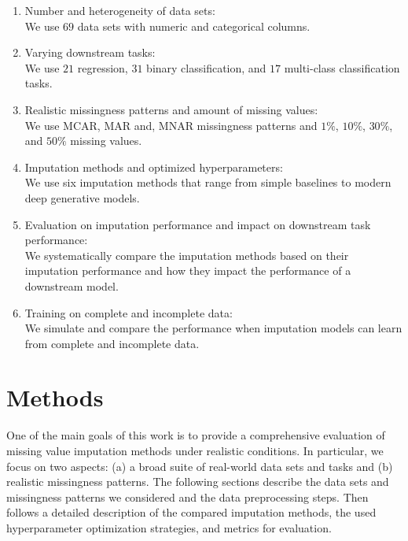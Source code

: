 \documentclass[utf8]{frontiersSCNS} %
\begin{document}
\begin{enumerate}
	\item Number and heterogeneity of data sets:\\
	We use $69$ data sets with numeric and categorical columns.

	\item Varying downstream tasks:\\
	We use $21$ regression, $31$ binary classification, and $17$ multi-class classification tasks.

	\item Realistic missingness patterns and amount of missing values:\\
	We use MCAR, MAR and, MNAR missingness patterns and $1\%$, $10\%$, $30\%$, and $50\%$ missing values.

	\item Imputation methods and optimized hyperparameters:\\
	We use six imputation methods that range from simple baselines to modern deep generative models.

	\item Evaluation on imputation performance and impact on downstream task performance:\\
	We systematically compare the imputation methods based on their imputation performance and how they impact the performance of a downstream model.

	\item Training on complete and incomplete data:\\
	We simulate and compare the performance when imputation models can learn from complete and incomplete data.
\end{enumerate}



\section{Methods}
\label{sec:methods}
%
One of the main goals of this work is to provide a comprehensive evaluation of missing value imputation methods under realistic conditions. In particular, we focus on two aspects: (a) a broad suite of real-world data sets and tasks and (b) realistic missingness patterns. The following sections describe the data sets and missingness patterns we considered and the data preprocessing steps. Then follows a detailed description of the compared imputation methods, the used hyperparameter optimization strategies, and metrics for evaluation.
\end{document}
